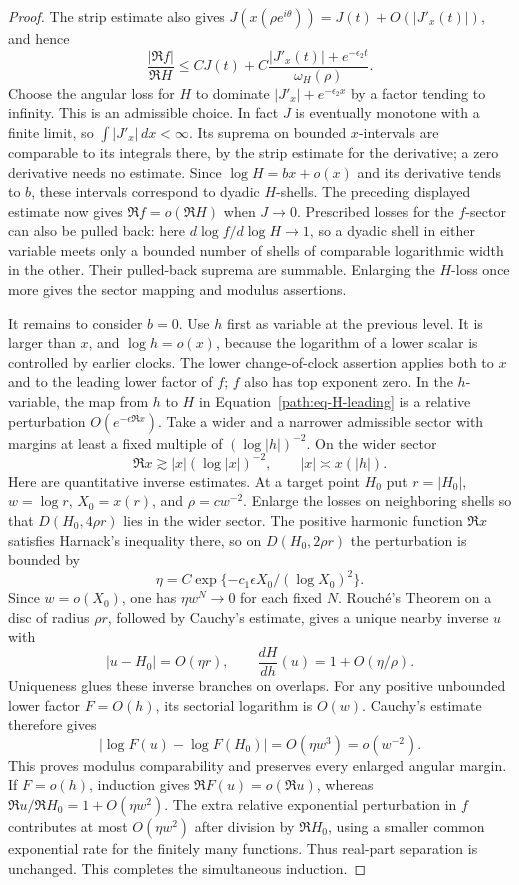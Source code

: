 \begin{proof}
The strip estimate also gives
\(J(x(\rho e^{i\theta}))=J(t)+O(|J'_x(t)|)\), and hence
\[
 \frac{|\Re f|}{\Re H}
 \le C J(t)+C\frac{|J'_x(t)|+e^{-\epsilon_2t}}{\omega_H(\rho)}.
\]
Choose the angular loss for \(H\) to dominate
\(|J'_x|+e^{-\epsilon_2x}\) by a factor tending to infinity.  This is
an admissible choice.  In fact \(J\) is eventually monotone with a
finite limit, so \(\int|J'_x|\,dx<\infty\).  Its suprema on bounded
\(x\)-intervals are comparable to its integrals there, by the strip
estimate for the derivative; a zero derivative needs no estimate.
Since \(\log H=bx+o(x)\) and its derivative tends to \(b\), these
intervals correspond to dyadic \(H\)-shells.  The preceding displayed
estimate now gives \(\Re f=o(\Re H)\) when \(J\to0\).  Prescribed
losses for the \(f\)-sector can also be pulled back: here
\(d\log f/d\log H\to1\), so a dyadic shell in either variable meets
only a bounded number of shells of comparable logarithmic width in
the other.  Their pulled-back suprema are summable.  Enlarging the
\(H\)-loss once more gives the sector mapping and modulus assertions.

It remains to consider \(b=0\).  Use \(h\) first as variable at the
previous level.  It is larger than \(x\), and \(\log h=o(x)\), because
the logarithm of a lower scalar is controlled by earlier clocks.
The lower change-of-clock assertion applies both to \(x\) and to the
leading lower factor of \(f\); \(f\) also has top exponent zero.
In the \(h\)-variable, the map from \(h\) to \(H\) in
Equation~\eqref{path:eq-H-leading} is a relative perturbation
\(O(e^{-\epsilon\Re x})\).  Take a wider and a narrower admissible
sector with margins at least a fixed multiple of
\((\log|h|)^{-2}\).  On the wider sector
\[
 \Re x\gtrsim |x|(\log|x|)^{-2},\qquad
 |x|\asymp x(|h|).
\]
Here are quantitative inverse estimates.  At a target point \(H_0\)
put \(r=|H_0|\), \(w=\log r\), \(X_0=x(r)\), and
\(\rho=cw^{-2}\).  Enlarge the losses on neighboring shells so that
\(D(H_0,4\rho r)\) lies in the wider sector.  The positive harmonic
function \(\Re x\) satisfies Harnack's inequality there, so on
\(D(H_0,2\rho r)\) the perturbation is bounded by
\[
 \eta=C\exp\{-c_1\epsilon X_0/(\log X_0)^2\}.
\]
Since \(w=o(X_0)\), one has \(\eta w^N\to0\) for each fixed
\(N\).  Rouch\'e's Theorem on a disc of radius \(\rho r\),
followed by Cauchy's estimate, gives a unique nearby inverse \(u\)
with
\[
 |u-H_0|=O(\eta r),\qquad
 \frac{dH}{dh}(u)=1+O(\eta/\rho).
\]
Uniqueness glues these inverse branches on overlaps.  For any positive
unbounded lower factor \(F=O(h)\), its sectorial logarithm is
\(O(w)\).  Cauchy's estimate therefore gives
\[
 |\log F(u)-\log F(H_0)|=O(\eta w^3)=o(w^{-2}).
\]
This proves modulus comparability and preserves every enlarged angular
margin.  If \(F=o(h)\), induction gives \(\Re F(u)=o(\Re u)\),
whereas \(\Re u/\Re H_0=1+O(\eta w^2)\).  The extra relative
exponential perturbation in \(f\) contributes at most \(O(\eta w^2)\)
after division by \(\Re H_0\), using a smaller common exponential
rate for the finitely many functions.  Thus real-part separation is
unchanged.  This completes the simultaneous induction.
\end{proof}

